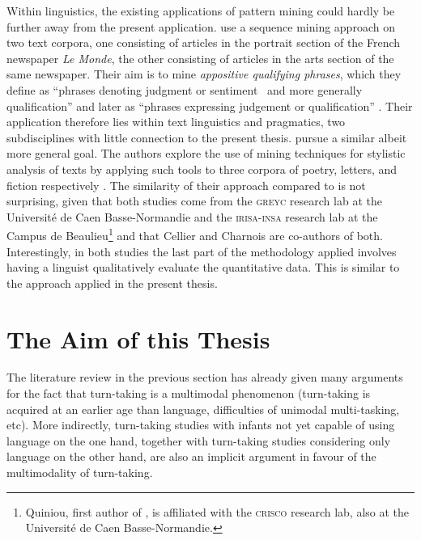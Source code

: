 Within linguistics, the existing applications of pattern mining could hardly be further away from the present application.
\citet{bechet_discovering_2012} use a sequence mining approach on two text corpora, one consisting of articles in the portrait section of the French newspaper \emph{Le Monde}, the other consisting of articles in the arts section of the same newspaper.
Their aim is to mine \emph{appositive qualifying phrases}, which they define as ``phrases denoting judgment or sentiment \citeellipses\ and more generally qualification'' \citep[]{bechet_discovering_2012} and later as ``phrases expressing judgement or qualification'' \citep[]{bechet_discovering_2012}.
Their application therefore lies within text linguistics and pragmatics, two subdisciplines with little connection to the present thesis.
\citet{quiniou_what_2012} pursue a similar albeit more general goal.
The authors explore the use of mining techniques for stylistic analysis of texts by applying such tools to three corpora of poetry, letters, and fiction respectively \citep[]{quiniou_what_2012}.
The similarity of their approach compared to \citet{bechet_discovering_2012} is not surprising, given that both studies come from the \textsc{greyc} research lab at the Université de Caen Basse-Normandie and the \textsc{irisa-insa} research lab at the Campus de Beaulieu\footnote{%
Quiniou, first author of \citet{quiniou_what_2012}, is affiliated with the \textsc{crisco} research lab, also at the Université de Caen Basse-Normandie.}
and that Cellier and Charnois are co-authors of both.
Interestingly, in both studies the last part of the methodology applied involves having a linguist qualitatively evaluate the quantitative data.
This is similar to the approach applied in the present thesis.


\section{The Aim of this Thesis}
\label{sec:introductionaim}
The literature review in the previous section has already given many arguments for the fact that turn-taking is a multimodal phenomenon (turn-taking is acquired at an earlier age than language, difficulties of unimodal multi-tasking, etc). %
More indirectly, turn-taking studies with infants not yet capable of using language on the one hand, together with turn-taking studies considering only language on the other hand, are also an implicit argument in favour of the multimodality of turn-taking.






















